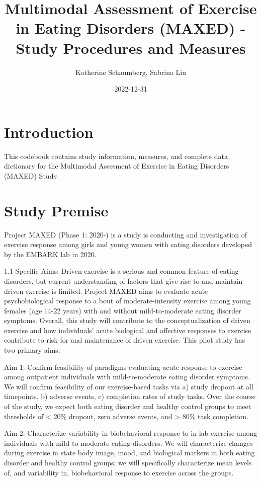 \documentclass[
]{book}
\title{Multimodal Assessment of Exercise in Eating Disorders (MAXED) - Study Procedures and Measures}
\author{Katherine Schaumberg, Sabrina Liu}
\date{2022-12-31}
\begin{document}
\maketitle

{
\setcounter{tocdepth}{1}
\tableofcontents
}
\hypertarget{introduction}{%
\chapter{Introduction}\label{introduction}}

This codebook contains study information, measures, and complete data dictionary for the Multimodal Assesment of Exercise in Eating Disorders (MAXED) Study

\hypertarget{study-premise}{%
\chapter{Study Premise}\label{study-premise}}

Project MAXED (Phase 1: 2020-) is a study is conducting and investigation of exercise response among girls and young women with eating disorders developed by the EMBARK lab in 2020.

1.1 Specific Aims:
Driven exercise is a serious and common feature of eating disorders, but current understanding of factors that give rise to and maintain driven exercise is limited. Project MAXED aims to evaluate acute psychobiological response to a bout of moderate-intensity exercise among young females (age 14-22 years) with and without mild-to-moderate eating disorder symptoms. Overall, this study will contribute to the conceptualization of driven exercise and how individuals' acute biological and affective responses to exercise contribute to risk for and maintenance of driven exercise. This pilot study has two primary aims:

Aim 1: Confirm feasibility of paradigms evaluating acute response to exercise among outpatient individuals with mild-to-moderate eating disorder symptoms. We will confirm feasibility of our exercise-based tasks via a) study dropout at all timepoints, b) adverse events, c) completion rates of study tasks. Over the course of the study, we expect both eating disorder and healthy control groups to meet thresholds of \textless{} 20\% dropout, zero adverse events, and \textgreater{} 80\% task completion.

Aim 2: Characterize variability in biobehavioral response to in-lab exercise among individuals with mild-to-moderate eating disorders. We will characterize changes during exercise in state body image, mood, and biological markers in both eating disorder and healthy control groups; we will specifically characterize mean levels of, and variability in, biobehavioral response to exercise across the groups.
\end{document}
